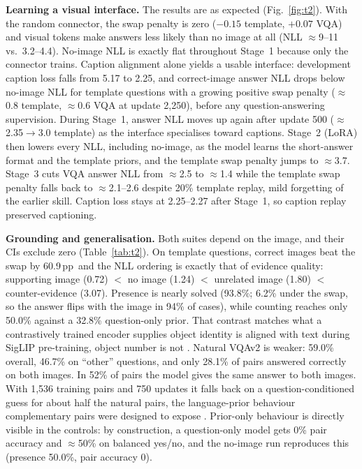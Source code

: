 \documentclass{article}
\newcommand{\pp}{\,pp}
\begin{document}
\textbf{Learning a visual interface.} The results are as expected (Fig.~\ref{fig:t2}). With the random connector, the swap penalty is zero ($-0.15$ template, $+0.07$ VQA) and visual tokens make answers less likely than no image at all (NLL $\approx$9--11 vs.\ 3.2--4.4). No-image NLL is exactly flat throughout Stage~1 because only the connector trains. Caption alignment alone yields a usable interface: development caption loss falls from 5.17 to 2.25, and correct-image answer NLL drops below no-image NLL for template questions with a growing positive swap penalty ($\approx$0.8 template, $\approx$0.6 VQA at update 2{,}250), before any question-answering supervision. During Stage~1, answer NLL moves up again after update 500 ($\approx$2.35$\to$3.0 template) as the interface specialises toward captions. Stage~2 (LoRA) then lowers every NLL, including no-image, as the model learns the short-answer format and the template priors, and the template swap penalty jumps to $\approx$3.7. Stage~3 cuts VQA answer NLL from $\approx$2.5 to $\approx$1.4 while the template swap penalty falls back to $\approx$2.1--2.6 despite 20\% template replay, mild forgetting of the earlier skill. Caption loss stays at 2.25--2.27 after Stage~1, so caption replay preserved captioning. 

\textbf{Grounding and generalisation.} Both suites depend on the image, and their CIs exclude zero (Table~\ref{tab:t2}). On template questions, correct images beat the swap by 60.9\pp\ and the NLL ordering is exactly that of evidence quality: supporting image (0.72) $<$ no image (1.24) $<$ unrelated image (1.80) $<$ counter-evidence (3.07). Presence is nearly solved (93.8\%; 6.2\% under the swap, so the answer flips with the image in 94\% of cases), while counting reaches only 50.0\% against a 32.8\% question-only prior. That contrast matches what a contrastively trained encoder supplies object identity is aligned with text during SigLIP pre-training, object number is not \citep{paiss2023count}. Natural VQAv2 is weaker: 59.0\% overall, 46.7\% on ``other'' questions, and only 28.1\% of pairs answered correctly on both images. In 52\% of pairs the model gives the same answer to both images. With 1{,}536 training pairs and 750 updates it falls back on a question-conditioned guess for about half the natural pairs, the language-prior behaviour complementary pairs were designed to expose \citep{goyal2017vqav2}. Prior-only behaviour is directly visible in the controls: by construction, a question-only model gets 0\% pair accuracy and $\approx$50\% on balanced yes/no, and the no-image run reproduces this (presence 50.0\%, pair accuracy 0).
\end{document}
